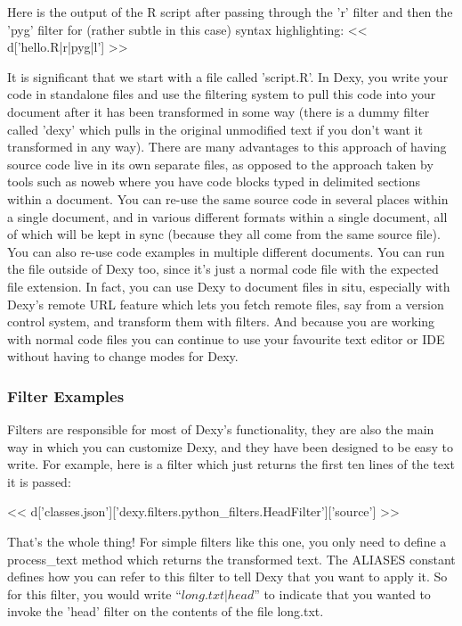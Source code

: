 \documentclass[custom, plainsections]{sciposter}
\begin{document}
\begin{multicols*}{2}
Here is the output of the R script after passing through the 'r' filter and then the 'pyg' filter for (rather subtle in this case) syntax highlighting:
\tiny
<< d['hello.R|r|pyg|l'] >>
\small

It is significant that we start with a file called 'script.R'. In Dexy, you write your code in standalone files and use the filtering system to pull this code into your document after it has been transformed in some way (there is a dummy filter called 'dexy' which pulls in the original unmodified text if you don't want it transformed in any way). There are many advantages to this approach of having source code live in its own separate files, as opposed to the approach taken by tools such as noweb where you have code blocks typed in delimited sections within a document. You can re-use the same source code in several places within a single document, and in various different formats within a single document, all of which will be kept in sync (because they all come from the same source file). You can also re-use code examples in multiple different documents. You can run the file outside of Dexy too, since it's just a normal code file with the expected file extension. In fact, you can use Dexy to document files in situ, especially with Dexy's remote URL feature which lets you fetch remote files, say from a version control system, and transform them with filters. And because you are working with normal code files you can continue to use your favourite text editor or IDE without having to change modes for Dexy.

\subsubsection*{Filter Examples}

Filters are responsible for most of Dexy's functionality, they are also the main way in which you can customize Dexy, and they have been designed to be easy to write. For example, here is a filter which just returns the first ten lines of the text it is passed:

\tiny
<< d['classes.json']['dexy.filters.python_filters.HeadFilter']['source'] >>
\small

That's the whole thing! For simple filters like this one, you only need to define a process\_text method which returns the transformed text. The ALIASES constant defines how you can refer to this filter to tell Dexy that you want to apply it. So for this filter, you would write ``$long.txt|head$'' to indicate that you wanted to invoke the 'head' filter on the contents of the file long.txt.


\end{multicols*}
\end{document}
